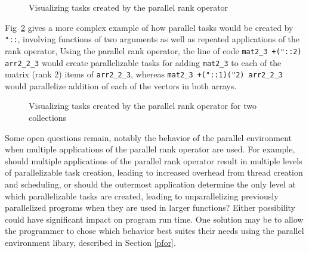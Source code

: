 \pagebreak


\begin{figure}[hptb]
\begin{quote}
\begin{singlespacing}
\begin{small}
\end{small}
\end{singlespacing}
\end{quote}
\caption{Visualizing tasks created by the parallel rank operator}
\label{fig::pr_tasks}
\end{figure}

Fig~\ref{fig::pr_tasks2} gives a more complex example of how parallel tasks would be created by \texttt{"::},
involving functions of two arguments as well as repeated applications of the rank operator,
Using the parallel rank operator, the line of code
\texttt{mat2\_3 +("::2) arr2\_2\_3} would create parallelizable tasks for adding \texttt{mat2\_3} to 
each of the matrix (rank 2) items of \texttt{arr2\_2\_3}, 
whereas \texttt{mat2\_3 +("::1)("2) arr2\_2\_3} would parallelize addition 
of each of the vectors in both arrays.

\begin{figure}[p]
\begin{quote}
\begin{singlespacing}
\begin{small}
\end{small}
\end{singlespacing}
\end{quote}
\caption{Visualizing tasks created by the parallel rank operator for two collections}
\label{fig::pr_tasks2}
\end{figure}

Some open questions remain, notably 
the behavior of the parallel environment when multiple applications of the parallel rank operator are used. 
For example, should multiple applications of the parallel rank operator result in multiple levels of parallelizable task creation, 
leading to increased overhead from thread creation and scheduling, 
or should the outermost application determine the only level at which parallelizable tasks are created, 
leading to unparallelizing previously parallelized programs when they are used in larger functions? 
Either possibility could have significant impact on program run time.
One solution may be to allow the programmer to chose which behavior best suites their needs 
using the parallel environment libary, described in Section \ref{pfor}.

